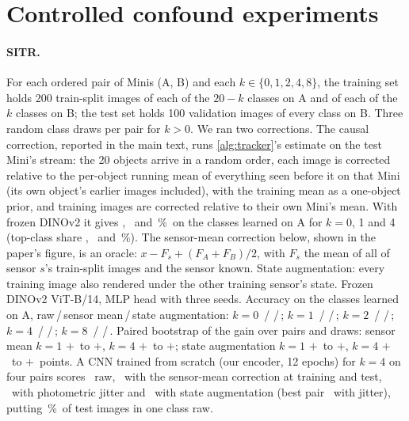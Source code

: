 \documentclass[10pt,twocolumn,letterpaper]{article}
\newcommand{\pct}{\,\%}
\begin{document}
\section{Controlled confound experiments}
\paragraph{SITR.} For each ordered pair of Minis (A, B) and each $k\in\{0,1,2,4,8\}$, the training set holds 200 train-split images of each of the $20-k$ classes on A and of each of the $k$ classes on B; the test set holds 100 validation images of every class on B. Three random class draws per pair for $k>0$. We ran two corrections. The causal correction, reported in the main text, runs \cref{alg:tracker}'s estimate on the test Mini's stream: the 20 objects arrive in a random order, each image is corrected relative to the per-object running mean of everything seen before it on that Mini (its own object's earlier images included), with the training mean as a one-object prior, and training images are corrected relative to their own Mini's mean. With frozen DINOv2 it gives \CfTrkSitrZeroCross, \CfTrkSitrOneCross\ and \CfTrkSitrFourCross\pct\ on the classes learned on A for $k=0$, 1 and 4 (top-class share \CfTrkSitrZeroTop, \CfTrkSitrOneTop\ and \CfTrkSitrFourTop\pct). The sensor-mean correction below, shown in the paper's figure, is an oracle: $x - F_s + (F_A+F_B)/2$, with $F_s$ the mean of all of sensor $s$'s train-split images and the sensor known. State augmentation: every training image also rendered under the other training sensor's state. Frozen DINOv2 ViT-B/14, MLP head with three seeds. Accuracy on the classes learned on A, raw\,/\,sensor mean\,/\,state augmentation: $k=0$ \CfSitrRawZeroCross\,/\,\CfSitrStreamZeroCross\,/\,\CfSitrSaugZeroCross; $k=1$ \CfSitrRawOneCross\,/\,\CfSitrStreamOneCross\,/\,\CfSitrSaugOneCross; $k=2$ \CfSitrRawTwoCross\,/\,\CfSitrStreamTwoCross\,/\,\CfSitrSaugTwoCross; $k=4$ \CfSitrRawFourCross\,/\,\CfSitrStreamFourCross\,/\,\CfSitrSaugFourCross; $k=8$ \CfSitrRawEightCross\,/\,\CfSitrStreamEightCross\,/\,\CfSitrSaugEightCross. Paired bootstrap of the gain over pairs and draws: sensor mean $k=1$ $+$\CfSitrStreamOneCiLo\ to $+$\CfSitrStreamOneCiHi, $k=4$ $+$\CfSitrStreamFourCiLo\ to $+$\CfSitrStreamFourCiHi; state augmentation $k=1$ $+$\CfSitrSaugOneCiLo\ to $+$\CfSitrSaugOneCiHi, $k=4$ $+$\CfSitrSaugFourCiLo\ to $+$\CfSitrSaugFourCiHi\ points. A CNN trained from scratch (our encoder, 12 epochs) for $k=4$ on four pairs scores \CfSitrCnnRawCross\ raw, \CfSitrCnnStreamCross\ with the sensor-mean correction at training and test, \CfSitrCnnJitterCross\ with photometric jitter and \CfSitrCnnSaugCross\ with state augmentation (best pair \CfSitrCnnJitterCrossMax\ with jitter), putting \CfSitrCnnRawTop\pct\ of test images in one class raw.
\end{document}
